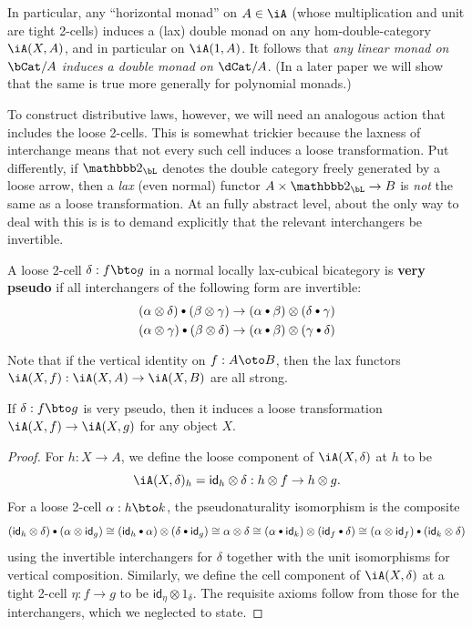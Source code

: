 \documentclass{amsart}
\newcommand{\bcomp}{\mathbin{\raisebox{1pt}{\scriptsize$\bullet$}}}
\let\ocomp\otimes
\renewcommand{\id}{\mathsf{id}}
\begin{document}
In particular, any ``horizontal monad'' on $A\in \iA$ (whose multiplication and unit are tight 2-cells) induces a (lax) double monad on any hom-double-category $\iA(X,A)$, and in particular on $\iA(1,A)$.
It follows that \emph{any linear monad on $\bCat/A$ induces a double monad on $\dCat/A$}.
(In a later paper we will show that the same is true more generally for polynomial monads.)

To construct distributive laws, however, we will need an analogous action that includes the loose 2-cells.
This is somewhat trickier because the laxness of interchange means that not every such cell induces a loose transformation.
Put differently, if $\dtwo_{\bL}$ denotes the double category freely generated by a loose arrow, then a \emph{lax} (even normal) functor $A\times \dtwo_{\bL} \to B$ is \emph{not} the same as a loose transformation.
At an fully abstract level, about the only way to deal with this is is to demand explicitly that the relevant interchangers be invertible.

\begin{defn}
  A loose 2-cell $\delta:f\bto g$ in a normal locally lax-cubical bicategory is \textbf{very pseudo} if all interchangers of the following form are invertible:
  \begin{align*}
    (\alpha\ocomp \delta) \bcomp (\beta\ocomp \gamma) &\to (\alpha\bcomp \beta)  \ocomp (\delta\bcomp \gamma)\\
    (\alpha\ocomp \gamma) \bcomp (\beta \ocomp \delta) &\to (\alpha\bcomp \beta)  \ocomp (\gamma\bcomp \delta)
  \end{align*}
\end{defn}

Note that if the vertical identity on $f:A\oto B$, then the lax functors $\iA(X,f) : \iA(X,A) \to \iA(X,B)$ are all strong.

\begin{lem}\label{thm:vps-transf}
  If $\delta:f\bto g$ is very pseudo, then it induces a loose transformation $\iA(X,f) \to \iA(X,g)$ for any object $X$.
\end{lem}
\begin{proof}
  For $h:X\to A$, we define the loose component of $\iA(X,\delta)$ at $h$ to be
  \[ \iA(X,\delta)_h = \id_h \ocomp \delta : h \ocomp f \to h\ocomp g. \]
  For a loose 2-cell $\alpha:h\bto k$, the pseudonaturality isomorphism is the composite
  \begin{equation*}
    (\id_h\ocomp \delta) \bcomp (\alpha \ocomp \id_g)
    \cong (\id_h\bcomp \alpha) \ocomp (\delta \bcomp \id_g)
    \cong \alpha \ocomp \delta
    \cong (\alpha \bcomp \id_k) \ocomp (\id_f\bcomp \delta)
    \cong (\alpha \ocomp \id_f) \bcomp (\id_k \ocomp \delta)
  \end{equation*}
  using the invertible interchangers for $\delta$ together with the unit isomorphisms for vertical composition.
  Similarly, we define the cell component of $\iA(X,\delta)$ at a tight 2-cell $\eta:f\to g$ to be $\id_\eta \ocomp 1_\delta$.
  The requisite axioms follow from those for the interchangers, which we neglected to state.
\end{proof}
\end{document}
